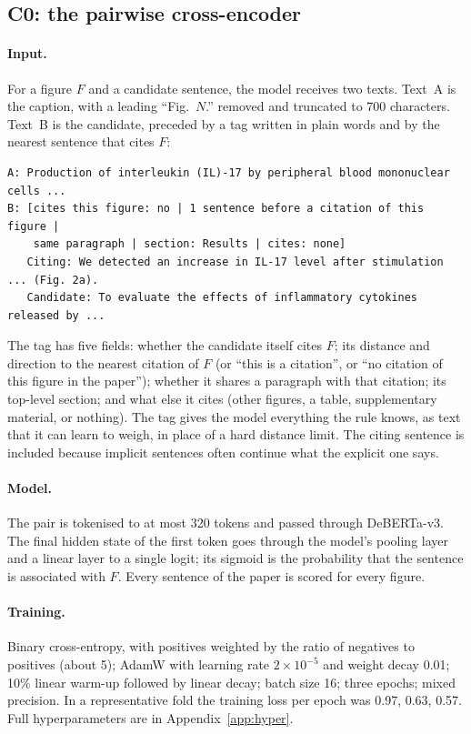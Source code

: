 \subsection{C0: the pairwise cross-encoder}
\label{sec:c0}
\paragraph{Input.} For a figure $F$ and a candidate sentence, the model receives two texts. Text~A is the
caption, with a leading ``Fig.~$N$.'' removed and truncated to 700 characters. Text~B is the candidate,
preceded by a tag written in plain words and by the nearest sentence that cites $F$:

\begin{Verbatim}[fontsize=\footnotesize,frame=single,framesep=6pt,rulecolor=\color{navy!30}]
A: Production of interleukin (IL)-17 by peripheral blood mononuclear cells ...
B: [cites this figure: no | 1 sentence before a citation of this figure |
    same paragraph | section: Results | cites: none]
   Citing: We detected an increase in IL-17 level after stimulation ... (Fig. 2a).
   Candidate: To evaluate the effects of inflammatory cytokines released by ...
\end{Verbatim}

The tag has five fields: whether the candidate itself cites $F$; its distance and direction to the nearest
citation of $F$ (or ``this is a citation'', or ``no citation of this figure in the paper''); whether it shares
a paragraph with that citation; its top-level section; and what else it cites (other figures, a table,
supplementary material, or nothing). The tag gives the model everything the rule knows, as text that it can
learn to weigh, in place of a hard distance limit. The citing sentence is included because implicit sentences
often continue what the explicit one says.

\paragraph{Model.} The pair is tokenised to at most 320 tokens and passed through DeBERTa-v3. The final hidden
state of the first token goes through the model's pooling layer and a linear layer to a single logit; its
sigmoid is the probability that the sentence is associated with $F$. Every sentence of the paper is scored
for every figure.

\paragraph{Training.} Binary cross-entropy, with positives weighted by the ratio of negatives to positives
(about 5); AdamW \citep{loshchilov2019adamw} with learning rate $2\times10^{-5}$ and weight decay 0.01; 10\%
linear warm-up followed by linear decay; batch size 16; three epochs; mixed precision. In a representative
fold the training loss per epoch was 0.97, 0.63, 0.57. Full hyperparameters are in
Appendix~\ref{app:hyper}.


